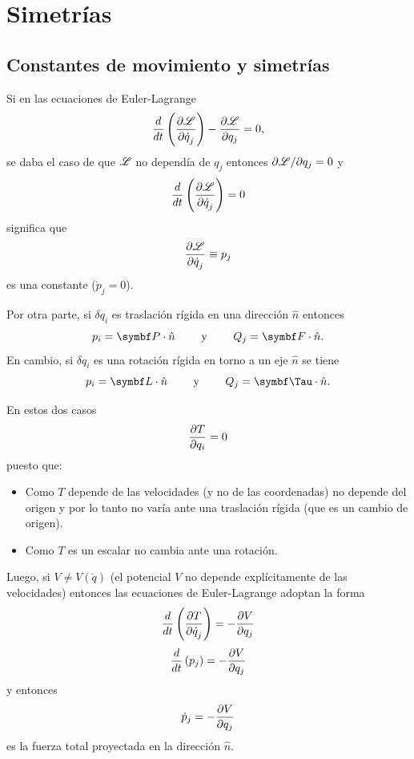 \documentclass[10pt,oneside]{CBFT_book}
\begin{document}
\chapter{Simetrías}

\section{Constantes de movimiento y simetrías}

Si en las ecuaciones de Euler-Lagrange
\[
	\frac{d}{dt}\left( \frac{\partial^{\hspace{-0.05em}} {\mathscr{L}}}{\partial {\dot{q}_j}^{\hspace{-0.05em}}} \right) - \frac{\partial^{\hspace{-0.05em}} {\mathscr{L}}}{\partial {q_j}^{\hspace{-0.05em}}}  = 0, 
\]
se daba el caso de que $ \mathscr{L} $ no dependía de $ q_j $ entonces
$ \partial {\mathscr{L}} /\partial {q_j}  = 0  $ y
\[
	\frac{d}{dt}\left( \frac{\partial^{\hspace{-0.05em}} {\mathscr{L}}}{\partial {\dot{q}_j}^{\hspace{-0.05em}}} \right) = 0
\]
significa que 
\[
	\frac{\partial^{\hspace{-0.05em}} {\mathscr{L}}}{\partial {\dot{q}_j}^{\hspace{-0.05em}}} \equiv p_j
\]
es una constante ($\dot{p}_j=0$).

Por otra parte, si $\delta q_i$ es traslación rígida en una dirección $\hat{n}$ entonces 
\[
	p_i = \vb{P}\cdot\hat{n} \qquad \text{ y } \qquad Q_j= \vb{F}\cdot\hat{n}. 
\]	
En cambio, si $\delta q_i$ es una rotación rígida en torno a un eje $\hat{n}$ se tiene 
\[
p_i = \vb{L}\cdot\hat{n} \qquad  \text{ y } \qquad Q_j= \vb{\Tau}\cdot\hat{n}.
\]

En estos dos casos
\[
	\frac{\partial^{\hspace{-0.05em}} {T}}{\partial {q_i}^{\hspace{-0.05em}}} = 0
\]
puesto que:
\begin{itemize}
 \item Como $T$ depende de las velocidades (y no de las coordenadas) no depende del origen y por lo tanto no 
varía ante una traslación rígida (que es un cambio de origen).
 \item Como $T$ es un escalar no cambia ante una rotación.
\end{itemize}

Luego, si $V \neq V(\dot{q})$ (el potencial $V$ no depende explícitamente de las velocidades) entonces las ecuaciones 
de Euler-Lagrange adoptan la forma
\[
	\frac{d}{dt}\left( \frac{\partial^{\hspace{-0.05em}} {T}}{\partial {\dot{q}_j}^{\hspace{-0.05em}}} \right) = - \frac{\partial^{\hspace{-0.05em}} {V}}{\partial {q_j}^{\hspace{-0.05em}}}   
\]
\[
	\frac{d}{dt}\left( p_j \right) = - \frac{\partial^{\hspace{-0.05em}} {V}}{\partial {q_j}^{\hspace{-0.05em}}}   
\]
y entonces 
\[
	\dot{p}_j = -\frac{\partial^{\hspace{-0.05em}} {V}}{\partial {q_j}^{\hspace{-0.05em}}}   
\]
es la fuerza total proyectada en la dirección $\hat{n}$.
\end{document}
